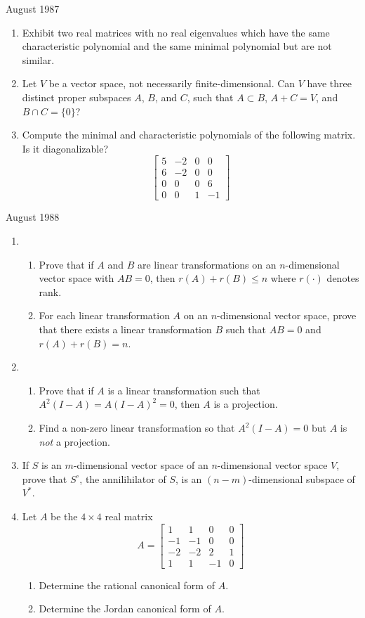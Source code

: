 \documentclass[11pt]{amsart}
\renewcommand{\(}{\left(}
\renewcommand{\)}{\right)}
\renewcommand{\[}{\left[}
\renewcommand{\]}{\right]}
\newcommand{\heading}[1]{\centerline{\large\sc #1}}
\newcommand{\num}{\begin{enumerate}}
\newcommand{\enum}{\end{enumerate}}
\begin{document}
\heading{August 1987}
\num
\item Exhibit two real matrices with no real eigenvalues which have
the same characteristic polynomial and the same minimal polynomial but
are not similar.
\item Let $V$ be a vector space, not necessarily finite-dimensional.
Can $V$ have three distinct proper subspaces $A$, $B$, and $C$, such
that $A\subset B$, $A+C=V$, and $B\cap C=\{0\}$?
\item Compute the minimal and characteristic polynomials of the
following matrix.  Is it diagonalizable?
$$
\[\begin{array}{cccc}5&-2&0&0\\ 6&-2&0&0\\0&0&0&6\\0&0&1&-1\end{array}\]
$$
\enum
\heading{August 1988}
\num\item\num
	\item Prove that if $A$ and $B$ are linear transformations on
an $n$-dimensional vector space with $AB=0$, then $r(A)+r(B)\le n$
where $r(\cdot)$ denotes rank.
	\item For each linear transformation $A$ on an $n$-dimensional
vector space, prove that there exists a linear transformation $B$ such
that $AB=0$ and $r(A)+r(B)=n$.
\enum
\item \num\item Prove that if $A$ is a linear transformation such that
$A^2(I-A)=A(I-A)^2=0$, then $A$ is a projection.
\item Find a non-zero linear transformation so that $A^2(I-A)=0$ but
$A$ is {\em not\/} a projection.
\enum
\item If $S$ is an $m$-dimensional vector space of an $n$-dimensional
vector space $V$, prove that $S^\circ$, the annilihilator  of $S$, is
an $(n-m)$-dimensional subspace of $V^*$.
\item Let $A$ be the $4\times 4$ real matrix
$$
A=\[\begin{array}{cccc} 1&1&0&0\\-1&-1&0&0\\-2&-2&2&1\\ 1&1&-1&0\end{array}\]
$$
\num
\item Determine the rational canonical form of $A$.
\item Determine the Jordan canonical form of $A$.
\enum
\enum
\end{document}

